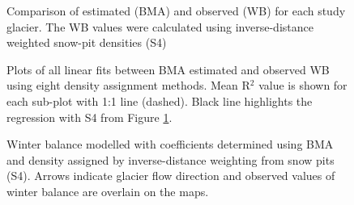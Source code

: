 \documentclass{sfuthesis}
\newcommand{\swedots}{Arrows indicate glacier flow direction and observed values of winter balance are overlain on the maps. }
\begin{document}
\begin{figure}[H]
	\caption[Comparison of estimated (BMA) and observed (WB) for each study glacier]{Comparison of estimated (BMA) and observed (WB) for each study glacier. The WB values were calculated using inverse-distance weighted snow-pit densities (S4)}
	\label{fig:BMSfit_opt8}
\end{figure}

\begin{figure}[H]
	\caption[Plots of all linear fits between BMA estimated and observed WB using eight density assignment methods]{Plots of all linear fits between BMA estimated and observed WB using eight density assignment methods. Mean R$^2$ value is shown for each sub-plot with 1:1 line (dashed). Black line highlights the regression with S4 from Figure \ref{fig:BMSfit_opt8}. }
	\label{fig:BMSfit_allLines}
\end{figure}

\begin{figure}[H]
	\caption[Winter balance modelled with coefficients determined using BMA and density assigned by inverse-distance weighting from snow pits (S4)]{Winter balance modelled with coefficients determined using BMA and density assigned by inverse-distance weighting from snow pits (S4). \swedots}
	\label{fig:BMSmodelledSWE}
\end{figure}
\end{document}
